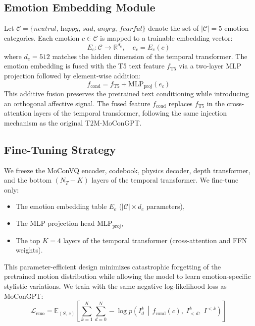 \documentclass[conference]{IEEEtran}
\begin{document}
\subsection{Emotion Embedding Module}
 
Let $\mathcal{C} = \{\textit{neutral},\, \textit{happy},\, \textit{sad},\,
\textit{angry},\, \textit{fearful}\}$ denote the set of $|\mathcal{C}|=5$ emotion
categories. Each emotion $c \in \mathcal{C}$ is mapped to a trainable embedding vector:
\begin{equation}
    E_e: \mathcal{C} \rightarrow \mathbb{R}^{d_e}, \quad e_c = E_e(c)
\end{equation}
where $d_e = 512$ matches the hidden dimension of the temporal transformer. The
emotion embedding is fused with the T5 text feature $f_{\text{T5}}$ via a two-layer
MLP projection followed by element-wise addition:
\begin{equation}
    f_{\text{cond}} = f_{\text{T5}} + \text{MLP}_{\text{proj}}(e_c)
\end{equation}
This additive fusion preserves the pretrained text conditioning while introducing an
orthogonal affective signal. The fused feature $f_{\text{cond}}$ replaces $f_{\text{T5}}$
in the cross-attention layers of the temporal transformer, following the same injection
mechanism as the original T2M-MoConGPT.
 
\subsection{Fine-Tuning Strategy}
 
We freeze the MoConVQ encoder, codebook, physics decoder, depth transformer, and the
bottom $(N_T - K)$ layers of the temporal transformer. We fine-tune only:
\begin{itemize}[noitemsep]
    \item The emotion embedding table $E_e$ ($|\mathcal{C}| \times d_e$ parameters),
    \item The MLP projection head $\text{MLP}_{\text{proj}}$,
    \item The top $K = 4$ layers of the temporal transformer (cross-attention and FFN weights).
\end{itemize}
This parameter-efficient design minimizes catastrophic forgetting of the pretrained
motion distribution while allowing the model to learn emotion-specific stylistic
variations. We train with the same negative log-likelihood loss as MoConGPT:
\begin{equation}
    \mathcal{L}_{\text{emo}} = \mathbb{E}_{(S,\, c)} \left[ \sum_{k=1}^{K} \sum_{d=0}^{N}
    -\log p\!\left(I^k_d \,\middle|\, f_{\text{cond}}(c),\; I^k_{<d},\; I^{<k}\right) \right]
\end{equation}
  
\end{document}
